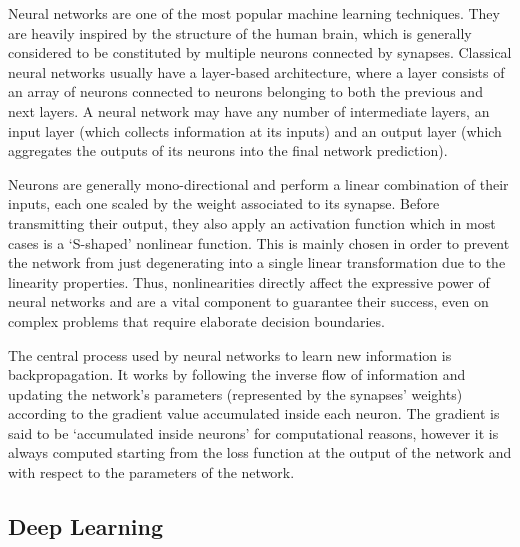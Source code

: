 Neural networks are one of the most popular machine learning techniques.
They are heavily inspired by the structure of the human brain, which is generally considered to be constituted by multiple neurons connected by synapses.
Classical neural networks usually have a layer-based architecture, where a layer consists of an array of neurons connected to neurons belonging to both the previous and next layers.
A neural network may have any number of intermediate layers, an input layer (which collects information at its inputs) and an output layer (which aggregates the outputs of its neurons into the final network prediction).

\begin{figure}[H]
    \centering
    \quad
    \caption{}
    \label{fig:background_nn-arch_neuron}
\end{figure}

Neurons are generally mono-directional and perform a linear combination of their inputs, each one scaled by the weight associated to its synapse.
Before transmitting their output, they also apply an activation function which in most cases is a `S-shaped' nonlinear function.
This is mainly chosen in order to prevent the network from just degenerating into a single linear transformation due to the linearity properties.
Thus, nonlinearities directly affect the expressive power of neural networks and are a vital component to guarantee their success, even on complex problems that require elaborate decision boundaries.

The central process used by neural networks to learn new information is backpropagation.
It works by following the inverse flow of information and updating the network's parameters (represented by the synapses' weights) according to the gradient value accumulated inside each neuron.
The gradient is said to be `accumulated inside neurons' for computational reasons, however it is always computed starting from the loss function at the output of the network and with respect to the parameters of the network.

\subsection{Deep Learning}

